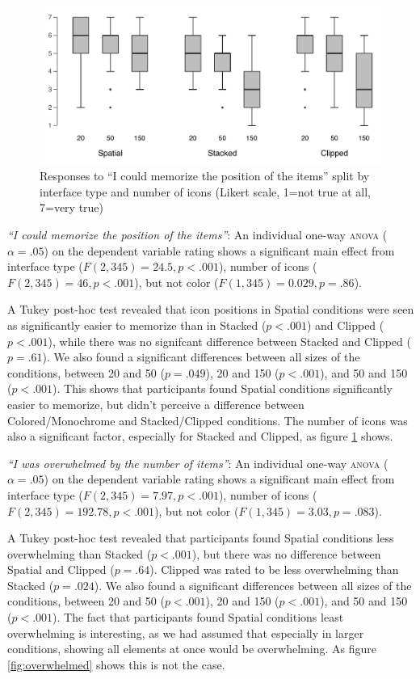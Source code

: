 \documentclass[nobib]{tufte-book} %
\begin{document}
\begin{figure}
  \includegraphics{postcon-memorize.pdf}
  \caption{Responses to ``I could memorize the position of the items'' split by interface type and number of icons (Likert scale, 1=not true at all, 7=very true)}
  \label{fig:memorize}
\end{figure}

\emph{``I could memorize the position of the items''}:
An individual one-way \textsc{anova} ($\alpha = .05$) on the dependent variable rating shows a significant main effect from interface type ($F(2,345) = 24.5, p < .001$), number of icons ($F(2,345) = 46, p < .001$), but not color ($F(1,345) = 0.029, p = .86$).

A Tukey post-hoc test revealed that icon positions in Spatial conditions were seen as significantly easier to memorize than in Stacked ($p < .001$) and Clipped ($p < .001$), while there was no signifcant difference between Stacked and Clipped ($p = .61$). We also found a significant differences between all sizes of the conditions, between 20 and 50 ($p = .049$), 20 and 150 ($p < .001$), and 50 and 150 ($p < .001$). This shows that participants found Spatial conditions significantly easier to memorize, but didn't perceive a difference between Colored/Monochrome and Stacked/Clipped conditions. The number of icons was also a significant factor, especially for Stacked and Clipped, as figure \ref{fig:memorize} shows.

\emph{``I was overwhelmed by the number of items''}:
An individual one-way \textsc{anova} ($\alpha = .05$) on the dependent variable rating shows a significant main effect from interface type ($F(2,345) = 7.97, p < .001$), number of icons ($F(2,345) = 192.78, p < .001$), but not color ($F(1,345) = 3.03, p = .083$).

A Tukey post-hoc test revealed that participants found Spatial conditions less overwhelming than Stacked ($p < .001$), but there was no difference between Spatial and Clipped ($p = .64$). Clipped was rated to be less overwhelming than Stacked ($p = .024$). We also found a significant differences between all sizes of the conditions, between 20 and 50 ($p < .001$), 20 and 150 ($p < .001$), and 50 and 150 ($p < .001$). The fact that participants found Spatial conditions least overwhelming is interesting, as we had assumed that especially in larger conditions, showing all elements at once would be overwhelming. As figure \ref{fig:overwhelmed} shows this is not the case.
\end{document}
